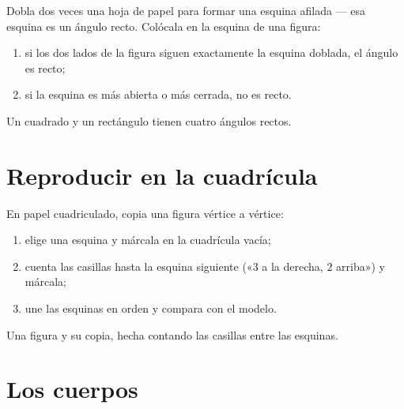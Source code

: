 \begin{method}\label{met:g2:shapes:rightangle}
Dobla dos veces una hoja de papel para formar una esquina afilada --- esa esquina
es un ángulo recto. Colócala en la esquina de una figura:
\begin{enumerate}
  \item si los dos lados de la figura siguen exactamente la esquina
        doblada, el ángulo es recto;
  \item si la esquina es más abierta o más cerrada, no es recto.
\end{enumerate}
Un cuadrado y un rectángulo tienen cuatro ángulos rectos.
\end{method}

\section{Reproducir en la cuadrícula}

\begin{method}\label{met:g2:shapes:copy}
En papel cuadriculado, copia una figura vértice a vértice:
\begin{enumerate}
  \item elige una esquina y márcala en la cuadrícula vacía;
  \item cuenta las casillas hasta la esquina siguiente («$3$ a la derecha, $2$
        arriba») y márcala;
  \item une las esquinas en orden y compara con el modelo.
\end{enumerate}
\end{method}

\begin{omfigure}

{\small Una figura y su copia, hecha contando las casillas entre las
esquinas.}
\end{omfigure}

\section{Los cuerpos}

